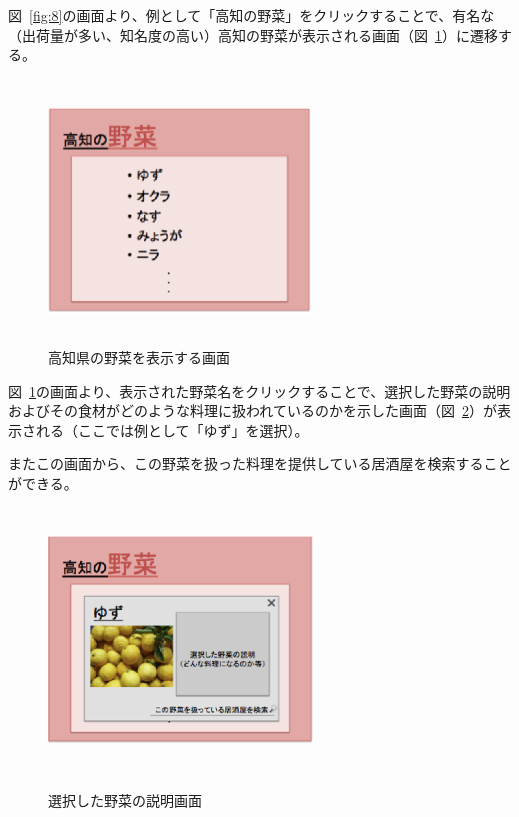 \documentclass[a4j,titlepage]{jarticle}
\begin{document}
図~\ref{fig:8}の画面より、例として「高知の野菜」をクリックすることで、有名な（出荷量が多い、知名度の高い）高知の野菜が表示される画面（図~\ref{fig:9}）に遷移する。
\clearpage
\begin {figure}[!htbp]
    \begin{center}
    \includegraphics [height=7cm, width=7cm]{9.eps}
    \caption {高知県の野菜を表示する画面}
    \label {fig:9}
    \end{center}
\end {figure}



図~\ref{fig:9}の画面より、表示された野菜名をクリックすることで、選択した野菜の説明およびその食材がどのような料理に扱われているのかを示した画面（図~\ref{fig:10}）が表示される（ここでは例として「ゆず」を選択）。



またこの画面から、この野菜を扱った料理を提供している居酒屋を検索することができる。




\begin {figure}[!htbp]
    \begin{center}
    \includegraphics [height=7cm, width=7cm]{10.eps}
　　    \caption {選択した野菜の説明画面}
    \label {fig:10}
    \end{center}
\end {figure}
\end{document}

